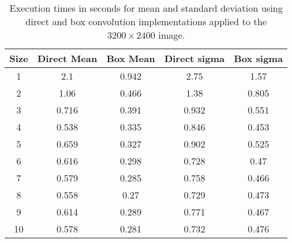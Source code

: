 \documentclass{InsightArticle}
\begin{document}
\begin{table}[phtb]
\centering
\begin{tabular}{ccccc}
\hline
Size  &  Direct Mean &  Box Mean & Direct sigma & Box sigma\\
\hline
1	&	2.1	&	0.942	&	2.75	&	1.57	\\
2	&	1.06	&	0.466	&	1.38	&	0.805	\\
3	&	0.716	&	0.391	&	0.932	&	0.551	\\
4	&	0.538	&	0.335	&	0.846	&	0.453	\\
5	&	0.659	&	0.327	&	0.902	&	0.525	\\
6	&	0.616	&	0.298	&	0.728	&	0.47	\\
7	&	0.579	&	0.285	&	0.758	&	0.466	\\
8	&	0.558	&	0.27	&	0.729	&	0.473	\\
9	&	0.614	&	0.289	&	0.771	&	0.467	\\
10	&	0.578	&	0.281	&	0.732	&	0.476	\\
\hline
\hline
\end{tabular}
\caption{Execution times in seconds for mean and standard deviation using direct and box convolution implementations applied to the $3200 \times 2400$ image.\label{tab:perfBoxConv-threads}}
\end{table}





\nocite{ITKSoftwareGuide}
\end{document}
